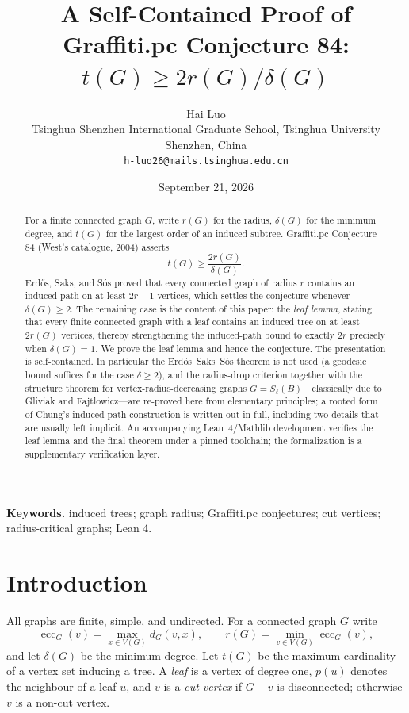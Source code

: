 \documentclass[11pt]{article}
\title{A Self-Contained Proof of Graffiti.pc Conjecture 84:\\
$t(G)\ge 2r(G)/\delta(G)$}
\author{Hai Luo\\[6pt]
  \normalsize Tsinghua Shenzhen International Graduate School, Tsinghua University\\
  \normalsize Shenzhen, China\\[2pt]
  \normalsize\texttt{h-luo26@mails.tsinghua.edu.cn}}
\date{September 21, 2026}
\theoremstyle{definition}
\newcommand{\ecc}{\operatorname{ecc}}
\begin{document}
\maketitle

\begin{abstract}
For a finite connected graph $G$, write $r(G)$ for the radius, $\delta(G)$ for
the minimum degree, and $t(G)$ for the largest order of an induced subtree.
Graffiti.pc Conjecture 84 (West's catalogue, 2004) asserts
\[
        t(G)\ge \frac{2r(G)}{\delta(G)}.
\]
Erd\H{o}s, Saks, and S\'os proved that every connected graph of radius $r$
contains an induced path on at least $2r-1$ vertices, which settles the
conjecture whenever $\delta(G)\ge2$.  The remaining case is the content of
this paper: the \emph{leaf lemma}, stating that every finite connected graph
with a leaf contains an induced tree on at least $2r(G)$ vertices, thereby
strengthening the induced-path bound to exactly $2r$ precisely when
$\delta(G)=1$.  We prove the leaf lemma and hence the conjecture.  The
presentation is self-contained.  In particular the Erd\H{o}s--Saks--S\'os
theorem is not used (a geodesic bound suffices for the case $\delta\ge2$),
and the radius-drop criterion together with the structure theorem for
vertex-radius-decreasing graphs $G=S_\ell(B)$---classically due to Gliviak
and Fajtlowicz---are re-proved here from elementary principles; a rooted
form of Chung's induced-path construction is written out in full, including
two details that are usually left implicit.  An accompanying Lean~4/Mathlib
development verifies the leaf lemma and the final theorem under a pinned
toolchain; the formalization is a supplementary verification layer.
\end{abstract}

\medskip
\noindent\textbf{Keywords.} induced trees; graph radius; Graffiti.pc
conjectures; cut vertices; radius-critical graphs; Lean 4.

\section{Introduction}\label{sec:intro}

All graphs are finite, simple, and undirected.  For a connected graph $G$
write
\[
 \ecc_G(v)=\max_{x\in V(G)} d_G(v,x),\qquad r(G)=\min_{v\in V(G)}\ecc_G(v),
\]
and let $\delta(G)$ be the minimum degree.  Let $t(G)$ be the maximum
cardinality of a vertex set inducing a tree.  A \emph{leaf} is a vertex of
degree one, $p(u)$ denotes the neighbour of a leaf $u$, and $v$ is a
\emph{cut vertex} if $G-v$ is disconnected; otherwise $v$ is a non-cut vertex.
\end{document}

